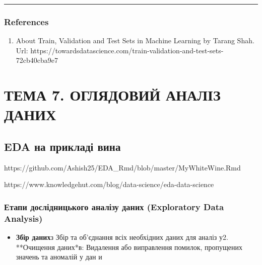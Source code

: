 \documentclass[
  letterpaper,
  DIV=11,
  numbers=noendperiod]{scrreprt}
\newenvironment{Shaded}{\begin{snugshade}}{\end{snugshade}}
\newcommand{\CommentTok}[1]{\textcolor[rgb]{0.37,0.37,0.37}{#1}}
\providecommand{\tightlist}{%
  \setlength{\itemsep}{0pt}\setlength{\parskip}{0pt}}\usepackage{longtable,booktabs,array}
\begin{document}
\begin{Shaded}
\end{Shaded}

\begin{center}\rule{0.5\linewidth}{0.5pt}\end{center}

\section{References}\label{references-8}

\begin{enumerate}
\def\labelenumi{\arabic{enumi}.}
\tightlist
\item
  About Train, Validation and Test Sets in Machine Learning by Tarang
  Shah. Url:
  https://towardsdatascience.com/train-validation-and-test-sets-72cb40cba9e7
\end{enumerate}

\part{ТЕМА 7. ОГЛЯДОВИЙ АНАЛІЗ ДАНИХ}

\chapter{EDA на прикладі
вина}\label{eda-ux43dux430-ux43fux440ux438ux43aux43bux430ux434ux456-ux432ux438ux43dux430}

https://github.com/Ashish25/EDA\_Rmd/blob/master/MyWhiteWine.Rmd

https://www.knowledgehut.com/blog/data-science/eda-data-science

\section{Етапи дослідницького аналізу даних (Exploratory Data
Analysis)}\label{ux435ux442ux430ux43fux438-ux434ux43eux441ux43bux456ux434ux43dux438ux446ux44cux43aux43eux433ux43e-ux430ux43dux430ux43bux456ux437ux443-ux434ux430ux43dux438ux445-exploratory-data-analysis}

\begin{itemize}
\tightlist
\item
  \textbf{Збір даних}з Збір та об'єднання всіх необхідних даних для
  аналіз у2. **Очищення даних*в: Видалення або виправлення помилок,
  пропущених значень та аномалій у дан и
\end{itemize}
\end{document}
